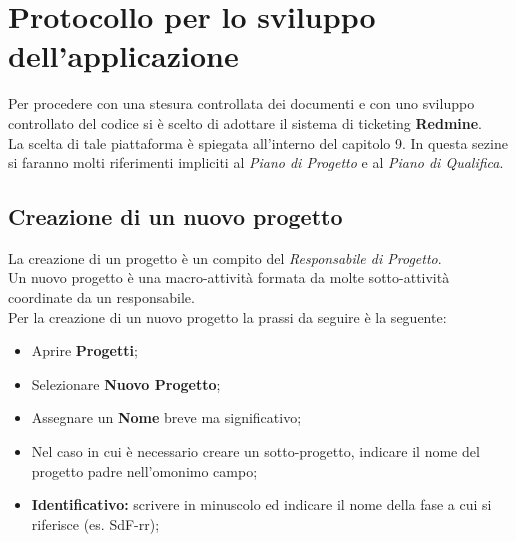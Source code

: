 \section{Protocollo per lo sviluppo dell’applicazione}
  Per procedere con una stesura controllata dei documenti e con uno sviluppo controllato del codice si è scelto di adottare
  il sistema di ticketing \textbf{Redmine}.\\
  La scelta di tale piattaforma è spiegata all'interno del capitolo 9.
  In questa sezine si faranno molti riferimenti impliciti al \emph{Piano di Progetto} e al \emph{Piano di  Qualifica}.
  \subsection{Creazione di un nuovo progetto}
    La creazione di un progetto è un compito del \emph{Responsabile di Progetto}.\\
    Un nuovo progetto è una macro-attività formata da molte sotto-attività coordinate da un responsabile.\\
    Per la creazione di un nuovo progetto la prassi da seguire è la seguente:
    \begin{itemize}
      \item Aprire \textbf{Progetti};
      \item Selezionare \textbf{Nuovo Progetto};
      \item Assegnare un \textbf{Nome} breve ma significativo;
      \item Nel caso in cui è necessario creare un sotto-progetto, indicare il nome del progetto padre nell'omonimo campo;
      \item \textbf{Identificativo: }scrivere in minuscolo ed indicare il nome della fase a cui si riferisce (es. SdF-rr);
    \end{itemize}
